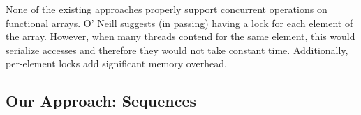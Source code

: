 None of the existing approaches properly support concurrent operations on
functional arrays.  O' Neill suggests (in passing) having a lock for each element
of the array. However, when many threads contend for the same element,
this would serialize accesses and therefore they would not take
constant time.   Additionally, per-element locks add significant memory
overhead.  



\subsection*{Our Approach: Sequences}

